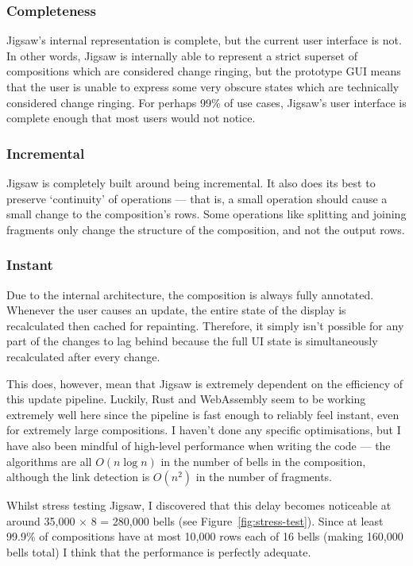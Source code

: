 \documentclass[12pt]{article}
\begin{document}
\subsubsection{Completeness}

Jigsaw's internal representation is complete, but the current user interface is not.  In other
words, Jigsaw is internally able to represent a strict superset of compositions which are considered
change ringing, but the prototype GUI means that the user is unable to express some very obscure
states which are technically considered change ringing.  For perhaps 99\% of use cases, Jigsaw's
user interface is complete enough that most users would not notice.

\subsubsection{Incremental}

Jigsaw is completely built around being incremental.  It also does its best to preserve `continuity'
of operations --- that is, a small operation should cause a small change to the composition's rows.
Some operations like splitting and joining fragments only change the structure of the composition,
and not the output rows.

\subsubsection{Instant}

Due to the internal architecture, the composition is always fully annotated.  Whenever the user
causes an update, the entire state of the display is recalculated then cached for repainting.
Therefore, it simply isn't possible for any part of the changes to lag behind because the full UI
state is simultaneously recalculated after every change.

This does, however, mean that Jigsaw is extremely dependent on the efficiency of this update
pipeline.  Luckily, Rust and WebAssembly seem to be working extremely well here since the pipeline
is fast enough to reliably feel instant, even for extremely large compositions.  I haven't done any
specific optimisations, but I have also been mindful of high-level performance when writing the code
--- the algorithms are all $O(n \log n)$ in the number of bells in the composition, although the
link detection is $O(n^2)$ in the number of fragments.

Whilst stress testing Jigsaw, I discovered that this delay becomes noticeable at around 35,000
$\times$ 8 = 280,000 bells (see Figure~\ref{fig:stress-test}).  Since at least 99.9\% of
compositions have at most 10,000 rows each of 16 bells (making 160,000 bells total) I think that the
performance is perfectly adequate.
\end{document}
